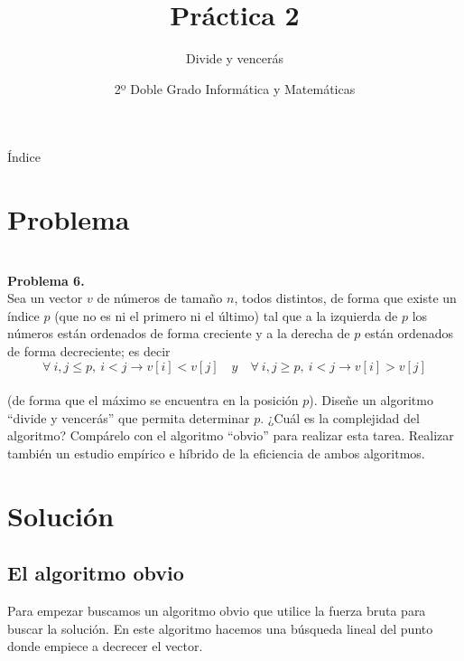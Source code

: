 \documentclass[compress]{beamer}
\title{Práctica 2}                                               %
\subtitle{Divide y vencerás}                                  %
\date{2º Doble Grado Informática y Matemáticas}                                                            %
\begin{document}
\begin{frame}
\titlepage
\end{frame}

\begin{frame}{Índice}
  \hypertarget{index}{}
  \tableofcontents
  
\end{frame}

\section{Problema}
\begin{frame}

\textbf{\\Problema 6.\\}
		Sea un vector $v$ de números de tamaño $n$, todos distintos, de forma que existe un índice $p$ (que no es ni el primero ni el último) tal que a la izquierda de $p$ los números están ordenados de forma creciente y a la derecha de $p$ están ordenados de forma decreciente; es decir%
$$\forall \ i,j \leq p , \ i < j \rightarrow v[i] < v[j] \quad y \quad \forall \ i,j \geq p, \ i < j \rightarrow v[i]>v[j]$$\\
(de forma que el máximo se encuentra en la posición $p$). Diseñe un algoritmo ``divide y vencerás'' que permita determinar $p$. ¿Cuál es la complejidad del algoritmo? Compárelo con el algoritmo ``obvio'' para realizar esta tarea. Realizar también un estudio empírico e híbrido de la eficiencia de ambos algoritmos.

\end{frame}	
	
\section{Solución}

\subsection{El algoritmo obvio}

\begin{frame}
	Para empezar buscamos un algoritmo obvio que utilice la fuerza bruta para buscar la solución. En este algoritmo hacemos una búsqueda lineal del punto donde empiece a decrecer el vector.
\end{frame}
\end{document}
